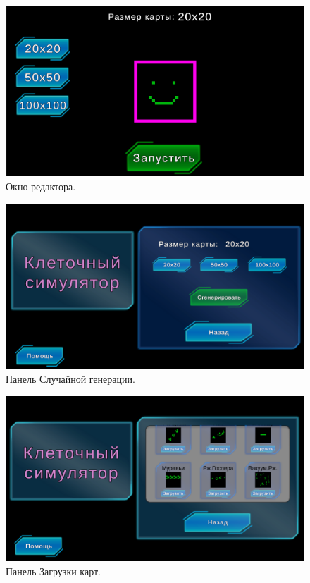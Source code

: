 \begin{figure}[H]
	\centering
	\includegraphics[width=1\textwidth]{images/Editor.png}  
	\caption{Окно редактора.}
	\label{Editor}
\end{figure}

\begin{figure}[H]
	\centering
	\includegraphics[width=1\textwidth]{images/rand1.png}  
	\caption{Панель Случайной генерации.}
	\label{rand}
\end{figure}

\begin{figure}[H]
	\centering
	\includegraphics[width=1\textwidth]{images/downld.png}  
	\caption{Панель Загрузки карт.}
	\label{downl}
\end{figure}

